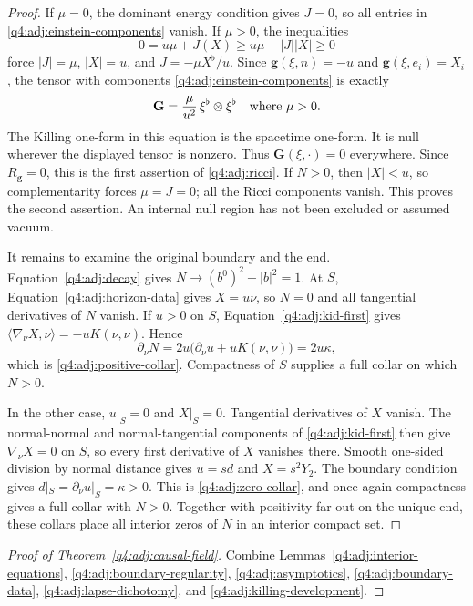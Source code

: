 \begin{proof}
If $\mu=0$, the dominant energy condition gives $J=0$, so all entries in
\eqref{q4:adj:einstein-components} vanish.  If $\mu>0$, the inequalities
\[
 0=u\mu+J(X)\ge u\mu-|J||X|\ge0
\]
force $|J|=\mu$, $|X|=u$, and $J=-\mu X^\flat/u$.
Since $\mathbf g(\xi,n)=-u$ and $\mathbf g(\xi,e_i)=X_i$, the tensor with
components \eqref{q4:adj:einstein-components} is exactly
\begin{equation}
 \mathbf G=\frac\mu{u^2}\,\xi^\flat\otimes\xi^\flat
 \quad\hbox{where }\mu>0.
 \label{q4:adj:null-stress}
\end{equation}
The Killing one-form in this equation is the spacetime one-form.
It is null wherever the displayed tensor is nonzero.  Thus
$\mathbf G(\xi,\cdot)=0$ everywhere.  Since $R_{\mathbf g}=0$, this is the
first assertion of \eqref{q4:adj:ricci}.  If $N>0$, then $|X|<u$, so
complementarity forces $\mu=J=0$; all the Ricci components vanish.  This proves
the second assertion.  An internal null region has not been excluded or
assumed vacuum.

It remains to examine the original boundary and the end.  Equation~\eqref{q4:adj:decay}
gives $N\to(b^0)^2-|b|^2=1$.  At $S$, Equation~\eqref{q4:adj:horizon-data}
gives $X=u\nu$, so $N=0$ and all tangential derivatives of $N$ vanish.
If $u>0$ on $S$, Equation~\eqref{q4:adj:kid-first} gives
$\langle\nabla_\nu X,\nu\rangle=-uK(\nu,\nu)$.  Hence
\[
 \partial_\nu N
 =2u\bigl(\partial_\nu u+uK(\nu,\nu)\bigr)=2u\kappa,
\]
which is \eqref{q4:adj:positive-collar}.  Compactness of $S$ supplies a full
collar on which $N>0$.

In the other case, $u|_S=0$ and $X|_S=0$.  Tangential derivatives of $X$
vanish.  The normal-normal and normal-tangential components of
\eqref{q4:adj:kid-first} then give $\nabla_\nu X=0$ on $S$, so every first
derivative of $X$ vanishes there.  Smooth one-sided division by normal
distance gives $u=sd$ and $X=s^2Y_2$.  The boundary condition gives
$d|_S=\partial_\nu u|_S=\kappa>0$.  This is
\eqref{q4:adj:zero-collar}, and once again compactness gives a full collar
with $N>0$.  Together with positivity far out on the unique end, these
collars place all interior zeros of $N$ in an interior compact set.
\end{proof}

\begin{proof}[Proof of Theorem~\ref{q4:adj:causal-field}]
Combine Lemmas~\ref{q4:adj:interior-equations},
\ref{q4:adj:boundary-regularity}, \ref{q4:adj:asymptotics},
\ref{q4:adj:boundary-data}, \ref{q4:adj:lapse-dichotomy}, and
\ref{q4:adj:killing-development}.
\end{proof}
